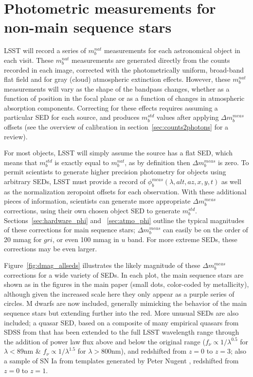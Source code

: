 \documentclass[12pt,preprint]{aastex}
\begin{document}
\section{Photometric measurements for non-main sequence stars}
\label{sec:photo_better}

LSST will record a series of $m_b^{nat}$ measurements for each
astronomical object in each visit. These $m_b^{nat}$ measurements are
generated directly from the counts recorded in each image, corrected
with the photometrically uniform, broad-band flat field and for gray
(cloud) atmospheric extinction effects. However, these $m_b^{nat}$
measurements will vary as the shape of the bandpass changes, whether
as a function of position in the focal plane or as a function of
changes in atmospheric absorption components. Correcting for these
effects requires assuming a particular SED for each source, and
produces $m_b^{std}$ values after applying $\Delta m_b^{meas}$ offsets
(see the overview of calibration in section~\ref{sec:counts2photons}
for a review).

For most objects, LSST will simply assume the source has a flat SED,
which means that $m_b^{std}$ is exactly equal to $m_b^{nat}$, as by
definition then $\Delta m_b^{meas}$ is zero. To permit scientists to
generate higher precision photometry for objects using arbitrary SEDs,
LSST must provide a record of $\phi_b^{meas}(\lambda,alt,az,x,y,t)$ as
well as the normalization zeropoint offsets for each observation. With
these additional pieces of information, scientists can generate more
appropriate $\Delta m_b^{meas}$ corrections, using their own chosen
object SED to generate $m_b^{std}$. Sections~\ref{sec:hardware_phi}
and ~\ref{sec:atmo_phi} outline the typical magnitudes of these
corrections for main sequence stars; $\Delta m_b^{meas}$ can easily be
on the order of 20 mmag for $gri$, or even 100 mmag in $u$ band. For
more extreme SEDs, these corrections may be even larger.

Figure~\ref{fig:dmag_allseds} illustrates the likely magnitude of
these $\Delta m_b^{meas}$ corrections for a wide variety of SEDs. In
each plot, the main sequence stars are shown as in the figures in the
main paper (small dots, color-coded by metallicity), although given
the increased scale here they only appear as a purple series of
circles. M dwarfs are now included, generally mimicking the behavior
of the main sequence stars but extending further into the red. More
unusual SEDs are also included; a quasar SED, based on a composite of
many empirical quasars from SDSS from \citet{VandenBerk2001} that has
been extended to the full LSST wavelength range through the addition
of power law flux above and below the original range ($f_\nu \propto
1/\lambda^{0.5}$ for $\lambda<89$nm \& $f_\nu \propto 1/\lambda^{1.5}$
for $\lambda>800$nm), and redshifted from $z=0$ to $z=3$; also a
sample of SN Ia from templates generated by Peter Nugent
\citep{Nugent2002}, redshifted from $z=0$ to $z=1$.
\end{document}
